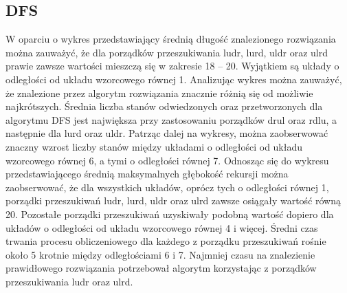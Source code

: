 \documentclass{classrep}
\begin{document}
\subsection{DFS}
{\color{black}
W oparciu o wykres przedstawiający średnią długość znalezionego rozwiązania można zauważyć, że dla porządków przeszukiwania ludr, lurd, uldr oraz ulrd prawie zawsze wartości mieszczą się 
w zakresie 18 – 20. Wyjątkiem są układy o odległości od układu wzorcowego równej 1. Analizując wykres można zauważyć, że znalezione przez algorytm rozwiązania znacznie różnią się od możliwie najkrótszych. Średnia liczba stanów odwiedzonych oraz przetworzonych dla algorytmu DFS jest największa przy zastosowaniu porządków drul oraz rdlu, a następnie dla lurd oraz uldr. Patrząc dalej na wykresy, można zaobserwować znaczny wzrost liczby stanów między układami o odległości od układu wzorcowego równej 6, a tymi o odległości równej 7. Odnosząc się do wykresu przedstawiającego średnią maksymalnych głębokość rekursji można zaobserwować, że dla wszystkich układów, oprócz tych o odległości równej 1, porządki przeszukiwań ludr, lurd, uldr oraz ulrd zawsze osiągały wartość równą 20. Pozostałe porządki przeszukiwań uzyskiwały podobną wartość dopiero dla układów o odległości od układu wzorcowego równej 4 i więcej. Średni czas trwania procesu obliczeniowego dla każdego z porządku przeszukiwań rośnie około 5 krotnie między odległościami 
6 i 7. Najmniej czasu na znalezienie prawidłowego rozwiązania potrzebował algorytm korzystając 
z porządków przeszukiwania ludr oraz ulrd.}
\end{document}
